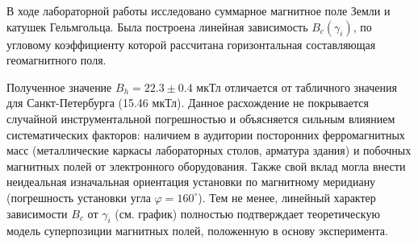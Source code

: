 \documentclass[a4paper,12pt]{article}
\begin{document}
\hspace{15pt} В ходе лабораторной работы исследовано суммарное магнитное поле Земли и катушек Гельмгольца. Была построена линейная зависимость $B_c(\gamma_i)$, по угловому коэффициенту которой рассчитана горизонтальная составляющая геомагнитного поля.

\hspace{15pt} Полученное значение $B_h = 22.3 \pm 0.4$ мкТл отличается от табличного значения для Санкт-Петербурга (15.46 мкТл). Данное расхождение не покрывается случайной инструментальной погрешностью и объясняется сильным влиянием систематических факторов: наличием в аудитории посторонних ферромагнитных масс (металлические каркасы лабораторных столов, арматура здания) и побочных магнитных полей от электронного оборудования. Также свой вклад могла внести неидеальная изначальная ориентация установки по магнитному меридиану (погрешность установки угла $\varphi = 160^\circ$). Тем не менее, линейный характер зависимости $B_c$ от $\gamma_i$ (см. график) полностью подтверждает теоретическую модель суперпозиции магнитных полей, положенную в основу эксперимента.
\end{document}
